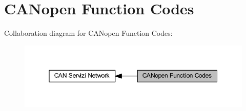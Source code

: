 \hypertarget{group___c_a_nopen___function___codes}{}\section{C\+A\+Nopen Function Codes}
\label{group___c_a_nopen___function___codes}
Collaboration diagram for C\+A\+Nopen Function Codes\+:\nopagebreak
\begin{figure}[H]
\begin{center}
\leavevmode
\includegraphics[width=350pt]{group___c_a_nopen___function___codes}
\end{center}
\end{figure}
